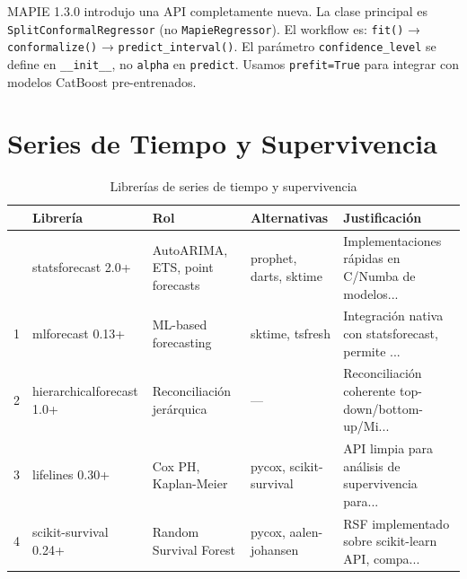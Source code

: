 \documentclass[
  spanish,
  11pt,
  letterpaper,
]{scrbook}
\theoremstyle{plain}
\theoremstyle{remark}
\begin{document}
\begin{tcolorbox}[enhanced jigsaw, arc=.35mm, bottomrule=.15mm, bottomtitle=1mm, breakable, colback=white, colbacktitle=quarto-callout-warning-color!10!white, colframe=quarto-callout-warning-color-frame, coltitle=black, left=2mm, leftrule=.75mm, opacityback=0, opacitybacktitle=0.6, rightrule=.15mm, title=\textcolor{quarto-callout-warning-color}{\faExclamationTriangle}\hspace{0.5em}{MAPIE 1.3.0 --- Cambio de API}, titlerule=0mm, toprule=.15mm, toptitle=1mm]

MAPIE 1.3.0 introdujo una API completamente nueva. La clase principal es
\texttt{SplitConformalRegressor} (no \texttt{MapieRegressor}). El
workflow es: \texttt{fit()} → \texttt{conformalize()} →
\texttt{predict\_interval()}. El parámetro \texttt{confidence\_level} se
define en \texttt{\_\_init\_\_}, no \texttt{alpha} en \texttt{predict}.
Usamos \texttt{prefit=True} para integrar con modelos CatBoost
pre-entrenados.

\end{tcolorbox}

\section{Series de Tiempo y
Supervivencia}\label{series-de-tiempo-y-supervivencia}

{

\begin{longtable}[]{@{}lllll@{}}

\caption{\label{tbl-ts-survival-stack}Librerías de series de tiempo y
supervivencia}

\tabularnewline

\toprule\noalign{}
& Librería & Rol & Alternativas & Justificación \\
\midrule\noalign{}
\endhead
\bottomrule\noalign{}
\endlastfoot
0 & statsforecast 2.0+ & AutoARIMA, ETS, point forecasts & prophet,
darts, sktime & Implementaciones rápidas en C/Numba de modelos... \\
1 & mlforecast 0.13+ & ML-based forecasting & sktime, tsfresh &
Integración nativa con statsforecast, permite ... \\
2 & hierarchicalforecast 1.0+ & Reconciliación jerárquica & --- &
Reconciliación coherente top-down/bottom-up/Mi... \\
3 & lifelines 0.30+ & Cox PH, Kaplan-Meier & pycox, scikit-survival &
API limpia para análisis de supervivencia para... \\
4 & scikit-survival 0.24+ & Random Survival Forest & pycox,
aalen-johansen & RSF implementado sobre scikit-learn API, compa... \\

\end{longtable}

}
\end{document}
